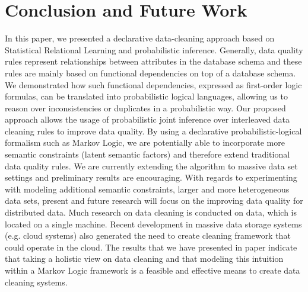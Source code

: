 
\section{Conclusion and Future Work}
\label{sec:conclusion}
In this paper, we presented a declarative data-cleaning approach based on Statistical Relational Learning and probabilistic inference. Generally, data quality rules represent relationships between attributes in the database schema and these rules are mainly based on functional dependencies on top of a database schema. We demonstrated how such functional dependencies, expressed as first-order logic formulas, can be translated into probabilistic logical languages, allowing us to reason over inconsistencies or duplicates in a probabilistic way. Our proposed approach allows the usage of probabilistic joint inference over interleaved data cleaning rules to improve data quality. By using a declarative probabilistic-logical formalism such as Markov Logic, we are potentially able to incorporate more semantic constraints (latent semantic factors) and therefore extend traditional data quality rules. We are currently extending the algorithm to massive data set settings and preliminary results are encouraging. With regards to experimenting with modeling additional semantic constraints, larger and more heterogeneous data sets, present and future research will focus on the improving data quality for distributed data. Much research on data cleaning is conducted on data, which is located on a single machine. Recent development in massive data storage systems (e.g. cloud systems) also generated the need to create cleaning framework that could operate in the cloud. The results that we have presented in paper indicate that taking a holistic view on data cleaning and that modeling this intuition within a Markov Logic framework is a feasible and effective means to create data cleaning systems. 